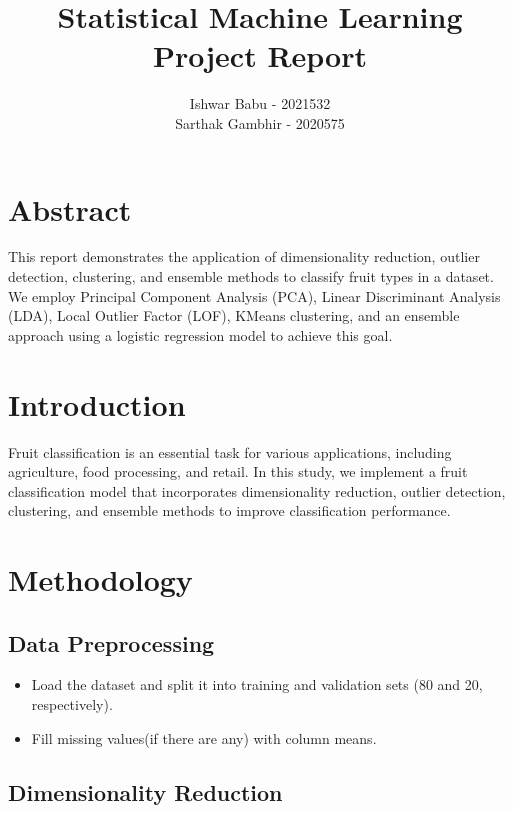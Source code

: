 \documentclass{article}
\title{\textbf{Statistical Machine Learning Project Report}}
\author{Ishwar Babu - 2021532 \\
        Sarthak Gambhir - 2020575}
\date{}
\begin{document}
\maketitle

\section{Abstract}
This report demonstrates the application of dimensionality reduction, outlier detection, clustering, and ensemble methods to classify fruit types in a dataset. We employ Principal Component Analysis (PCA), Linear Discriminant Analysis (LDA), Local Outlier Factor (LOF), KMeans clustering, and an ensemble approach using a logistic regression model to achieve this goal.

\section{Introduction}
Fruit classification is an essential task for various applications, including agriculture, food processing, and retail. In this study, we implement a fruit classification model that incorporates dimensionality reduction, outlier detection, clustering, and ensemble methods to improve classification performance.

\section{Methodology}

\subsection{Data Preprocessing}

\begin{itemize}
    \item Load the dataset and split it into training and validation sets (80 and 20, respectively).
    \item Fill missing values(if there are any) with column means.
\end{itemize}

\subsection{Dimensionality Reduction}
\end{document}
